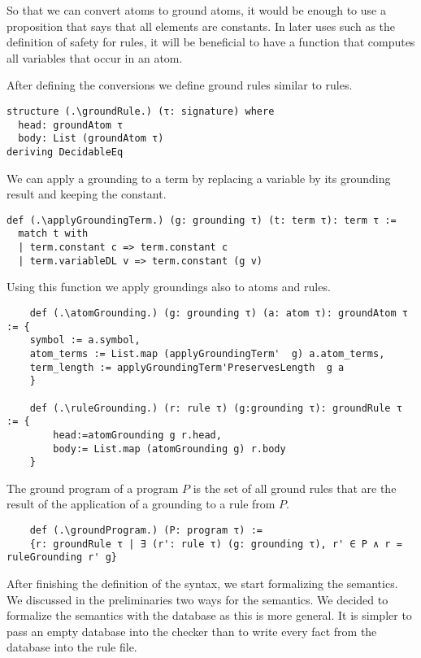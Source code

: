 So that we can convert atoms to ground atoms, it would be enough to use a proposition that says that all elements are constants. In later uses such as the definition of safety for rules, it will be beneficial to have a function that computes all variables that occur in an atom. 



After defining the conversions we define ground rules similar to rules.

\begin{lstlisting}
structure (.\groundRule.) (τ: signature) where
  head: groundAtom τ
  body: List (groundAtom τ)
deriving DecidableEq
\end{lstlisting}

We can apply a grounding to a term by replacing a variable by its grounding result and keeping the constant.
\begin{lstlisting}
def (.\applyGroundingTerm.) (g: grounding τ) (t: term τ): term τ :=
  match t with
  | term.constant c => term.constant c
  | term.variableDL v => term.constant (g v)
\end{lstlisting}

Using this function we apply groundings also to atoms and rules. 

\begin{lstlisting}
    def (.\atomGrounding.) (g: grounding τ) (a: atom τ): groundAtom τ := {
    symbol := a.symbol, 
    atom_terms := List.map (applyGroundingTerm'  g) a.atom_terms, 
    term_length := applyGroundingTerm'PreservesLength  g a
    }

    def (.\ruleGrounding.) (r: rule τ) (g:grounding τ): groundRule τ := {
        head:=atomGrounding g r.head, 
        body:= List.map (atomGrounding g) r.body 
    }

\end{lstlisting}

The ground program of a program $P$ is the set of all ground rules that are the result of the application of a grounding to a rule from $P$.

\begin{lstlisting}
    def (.\groundProgram.) (P: program τ) := 
    {r: groundRule τ | ∃ (r': rule τ) (g: grounding τ), r' ∈ P ∧ r = ruleGrounding r' g}
\end{lstlisting}

After finishing the definition of the syntax, we start formalizing the semantics. We discussed in the preliminaries two ways for the semantics. We decided to formalize the semantics with the database as this is more general. It is simpler to pass an empty database into the checker than to write every fact from the database into the rule file.

